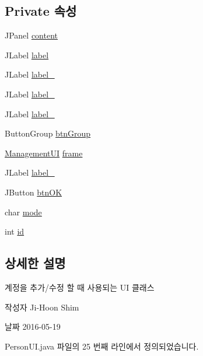 \subsection*{Private 속성}
\begin{DoxyCompactItemize}
\item 
J\+Panel \hyperlink{classpkg_1_1_person_u_i_a05931d9e728132b35d239a5229eea21d}{content}
\item 
J\+Label \hyperlink{classpkg_1_1_person_u_i_a161533277b04a1a726c08526184d9fad}{label}
\item 
J\+Label \hyperlink{classpkg_1_1_person_u_i_a559152fef6563f4ee1da958263beb299}{label\+\_}
\item 
J\+Label \hyperlink{classpkg_1_1_person_u_i_af40d666a6f4a8b9fd70d773377b85d23}{label\+\_}
\item 
J\+Label \hyperlink{classpkg_1_1_person_u_i_ace0f99b0457a8e521a18fb1026b7c885}{label\+\_}
\item 
Button\+Group \hyperlink{classpkg_1_1_person_u_i_ab021b25096eb0dec11276a56b226dc42}{btn\+Group}
\item 
\hyperlink{classpkg_1_1_management_u_i}{Management\+UI} \hyperlink{classpkg_1_1_person_u_i_ab7d796c52a55426d71e77f6496bd4012}{frame}
\item 
J\+Label \hyperlink{classpkg_1_1_person_u_i_a6f0d2bbe796a121c3d68046ac8f8e7e3}{label\+\_}
\item 
J\+Button \hyperlink{classpkg_1_1_person_u_i_ac8976435621b24ee0012f2553d5e168d}{btn\+OK}
\item 
char \hyperlink{classpkg_1_1_person_u_i_a1e904b333d5a5ed5fccbd652278af776}{mode}
\item 
int \hyperlink{classpkg_1_1_person_u_i_a0e597f46bc66957eb8b888fab950e712}{id}
\end{DoxyCompactItemize}


\subsection{상세한 설명}
계정을 추가/수정 할 때 사용되는 UI 클래스 

\begin{DoxyAuthor}{작성자}
Ji-\/\+Hoon Shim 
\end{DoxyAuthor}
\begin{DoxyDate}{날짜}
2016-\/05-\/19 
\end{DoxyDate}


Person\+U\+I.\+java 파일의 25 번째 라인에서 정의되었습니다.



